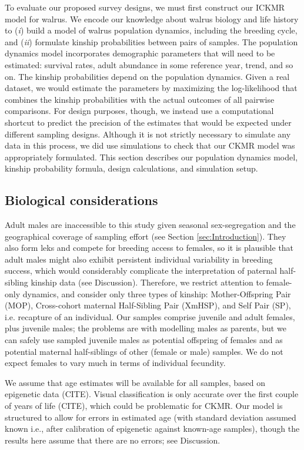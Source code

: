 To evaluate our proposed survey designs, we must first construct our
ICKMR model for walrus. We encode our knowledge about walrus biology
and life history to (\textit{i}) build a model of walrus population
dynamics, including the breeding cycle, and (\textit{ii}) formulate
kinship probabilities between pairs of samples. The population dynamics
model incorporates demographic parameters that will need to be estimated:
survival rates, adult abundance in some reference year, trend, and
so on. The kinship probabilities depend on the population dynamics.
Given a real dataset, we would estimate the parameters by maximizing
the log-likelihood that combines the kinship probabilities with the
actual outcomes of all pairwise comparisons. For design purposes,
though, we instead use a computational shortcut to predict the precision
of the estimates that would be expected under different sampling designs.
Although it is not strictly necessary to simulate any data in this
process, we did use simulations to check that our CKMR model was appropriately
formulated. This section describes our population dynamics model,
kinship probability formula, design calculations, and simulation setup.

\subsection{Biological considerations}

Adult males are inaccessible to this study given seasonal sex-segregation
and the geographical coverage of sampling effort (see Section \ref{sec:Introduction}).
They also form leks and compete for breeding access to females, so
it is plausible that adult males might also exhibit persistent individual
variability in breeding success, which would considerably complicate
the interpretation of paternal half-sibling kinship data (see Discussion).
Therefore, we restrict attention to female-only dynamics, and consider
only three types of kinship: Mother-Offspring Pair (MOP), Cross-cohort
maternal Half-Sibling Pair (XmHSP), and Self Pair (SP), i.e. recapture
of an individual. Our samples comprise juvenile and adult females,
plus juvenile males; the problems are with modelling males as parents,
but we can safely use sampled juvenile males as potential offspring
of females and as potential maternal half-siblings of other (female
or male) samples. We do not expect females to vary much in terms of
individual fecundity.

We assume that age estimates will be available for all samples, based
on epigenetic data (CITE). Visual classification is only accurate
over the first couple of years of life (CITE), which could be problematic
for CKMR. Our model is structured to allow for errors in estimated
age (with standard deviation assumed known i.e., after calibration
of epigenetic against known-age samples), though the results here
assume that there are no errors; see Discussion.

